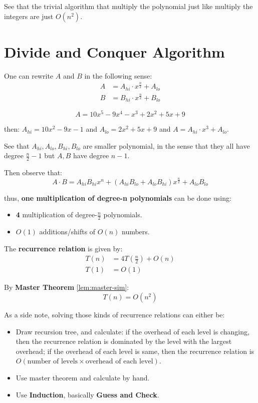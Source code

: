 See that the trivial algorithm that multiply the polynomial just like multiply the integers are just \( O(n^2) \).

\section{Divide and Conquer Algorithm}

One can rewrite \( A \) and \( B \) in the following sense:
\[
	\begin{aligned}
		A & = A_{hi}\cdot x^{\frac{n}{2}} + A_{lo} \\
		B & = B_{hi}\cdot x^{\frac{n}{2}} + B_{lo}
	\end{aligned}
\]

\begin{eg}
	\leavevmode
	\[
		A = 10x^5 - 9x^4 -x^3 +2x^2 +5x+9
	\]

	then:
	\( A_{hi} = 10 x^2 - 9x -1 \) and \( A_{lo} = 2x^2 +5x + 9 \) and \( A = A_{hi}\cdot x^3 + A_{lo} \).
\end{eg}

See that \( A_{hi}, A_{lo}, B_{hi}, B_{lo} \) are smaller polynomial, in the sense that they all have degree \( \frac{n}{2} - 1 \) but \( A,B \) have degree \( n-1 \).

Then observe that:
\[
	A\cdot B = A_{hi}B_{hi}x^n + (A_{hi}B_{lo} + A_{lo}B_{hi})x^{\frac{n}{2}} + A_{lo}B_{lo}
\]

thus, \textbf{one multiplication of degree-n polynomials} can be done using:
\begin{itemize}
	\item \textbf{4} multiplication of degree-\( \frac{n}{2} \) polynomials.
	\item \( O(1) \) additions/shifts of \( O(n) \) numbers.
\end{itemize}

The \textbf{recurrence relation} is given by:
\[
	\begin{aligned}
		T(n) & = 4T(\frac{n}{2}) + O(n) \\
		T(1) & = O(1)
	\end{aligned}
\]

By \textbf{Master Theorem} \ref{lem:master-sim}:
\[
	T(n) = O(n^2)
\]

\begin{note}
	As a side note, solving those kinds of recurrence relations can either be:
	\begin{itemize}
		\item Draw recursion tree, and calculate: if the overhead of each level is changing, then the recurrence relation is dominated by the level with the largest overhead; if the overhead of each level is same, then the recurrence relation is \( O(\text{number of levels} \times \text{overhead of each level}) \).
		\item Use master theorem and calculate by hand.
		\item Use \textbf{Induction}, basically \textbf{Guess and Check}.
	\end{itemize}
\end{note}

